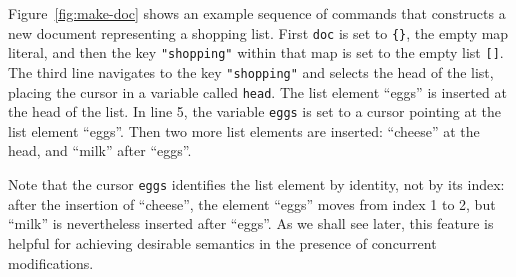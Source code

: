 \documentclass[10pt,journal,compsoc]{IEEEtran}
\begin{document}
Figure~\ref{fig:make-doc} shows an example sequence of commands that constructs a new document representing a shopping list. First \texttt{doc} is set to \verb|{}|, the empty map literal, and then the key \verb|"shopping"| within that map is set to the empty list \verb|[]|. The third line navigates to the key \verb|"shopping"| and selects the head of the list, placing the cursor in a variable called \texttt{head}. The list element ``eggs'' is inserted at the head of the list. In line 5, the variable \texttt{eggs} is set to a cursor pointing at the list element ``eggs''. Then two more list elements are inserted: ``cheese'' at the head, and ``milk'' after ``eggs''.

Note that the cursor \texttt{eggs} identifies the list element by identity, not by its index: after the insertion of ``cheese'', the element ``eggs'' moves from index 1 to 2, but ``milk'' is nevertheless inserted after ``eggs''. As we shall see later, this feature is helpful for achieving desirable semantics in the presence of concurrent modifications.
\end{document}
